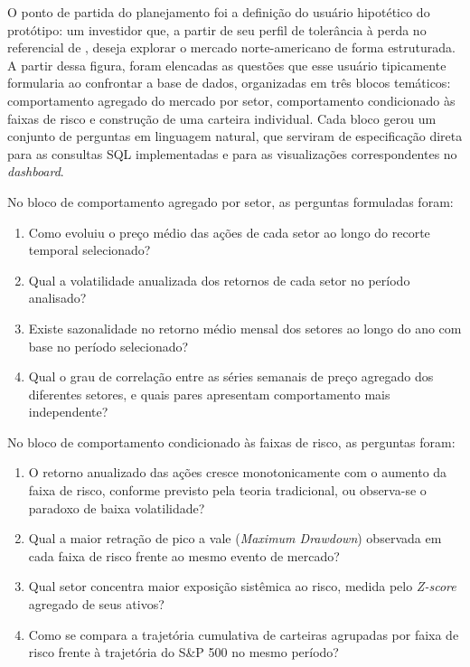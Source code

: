 O ponto de partida do planejamento foi a definição do usuário hipotético do protótipo: um investidor que, a partir de seu perfil de tolerância à perda no referencial de , deseja explorar o mercado norte-americano de forma estruturada. A partir dessa figura, foram elencadas as questões que esse usuário tipicamente formularia ao confrontar a base de dados, organizadas em três blocos temáticos: comportamento agregado do mercado por setor, comportamento condicionado às faixas de risco e construção de uma carteira individual. Cada bloco gerou um conjunto de perguntas em linguagem natural, que serviram de especificação direta para as consultas SQL implementadas e para as visualizações correspondentes no \textit{dashboard}.

No bloco de comportamento agregado por setor, as perguntas formuladas foram:

\begin{enumerate}
    \item Como evoluiu o preço médio das ações de cada setor ao longo do recorte temporal selecionado?
    \item Qual a volatilidade anualizada dos retornos de cada setor no período analisado?
    \item Existe sazonalidade no retorno médio mensal dos setores ao longo do ano com base no período selecionado?
    \item Qual o grau de correlação entre as séries semanais de preço agregado dos diferentes setores, e quais pares apresentam comportamento mais independente?
\end{enumerate}

No bloco de comportamento condicionado às faixas de risco, as perguntas foram:

\begin{enumerate}
    \item O retorno anualizado das ações cresce monotonicamente com o aumento da faixa de risco, conforme previsto pela teoria tradicional, ou observa-se o paradoxo de baixa volatilidade?
    \item Qual a maior retração de pico a vale (\textit{Maximum Drawdown}) observada em cada faixa de risco frente ao mesmo evento de mercado?
    \item Qual setor concentra maior exposição sistêmica ao risco, medida pelo \textit{Z-score} agregado de seus ativos?
    \item Como se compara a trajetória cumulativa de carteiras agrupadas por faixa de risco frente à trajetória do S\&P 500 no mesmo período?
\end{enumerate}

